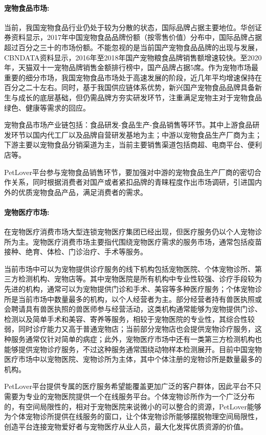 \documentclass[a4paper]{ctexart}
\begin{document}
\paragraph{宠物食品市场:}

当前，我国宠物食品行业仍处于较为分散的状态，国际品牌占据主要地位。华创证券资料显示，2017年中国宠物食品品牌份额（按零售价值）分布中，国际品牌占据超过百分之三十的市场份额。不能忽视的是当前国产宠物食品品牌的出现与发展，CBNDATA资料显示，2016年至2018年国产宠物粮食品牌销售额增速较快。至2020年，天猫双十一宠物品牌销售金额排行榜中，国产品牌占据5席。作为宠物市场最重要的细分市场，我国宠物食品市场处于高速发展的阶段，近几年平均增速保持在百分之二十左右。同时，基于我国供应链体系优势，新兴国产宠物食品品牌具备新生与成长的底层基础，但仍需品牌方夯实研发环节，注重满足宠物主对于宠物食品绿色、健康等需求的回应。

宠物食品市场产业链包括：食品研发-食品生产-食品销售等环节。其中上游食品研发环节以国内代工厂以及品牌自营研发基地为主；中游以宠物食品生产厂商为主；下游主要以宠物食品分销渠道为主，当前主要销售渠道包括商超、电商平台、便利店等。

PetLover平台参与宠物食品销售环节，要加强对中游的宠物食品生产厂商的密切合作关系，同时根据消费者对国产或者紧扣品牌的青睐程度作出市场调研，引进国内外的优质宠物食品产品，满足消费者的需求。

\paragraph{宠物医疗市场:}

在宠物医疗消费市场大型连锁宠物医疗集团已经出现，但医疗服务仍以个人宠物诊所为主。宠物医疗消费市场主要指代围绕宠物医疗需求的服务市场，通常包括疫苗接种、绝育、体检、门诊治疗、手术等服务。

当前市场中可以为宠物提供诊疗服务的线下机构包括宠物医院、个体宠物诊所、第三方检测机构、宠物店等。其中宠物医院是所有机构中专业性较强、诊疗手段较为先进的机构，通常可以为宠物提供门诊和手术、美容等多种医疗服务；个体宠物诊所是当前市场中数量最多的机构，以个人经营者为主。部分经营者持有兽医执照或会聘请具有兽医执照的兽医师参与经营活动，这类机构通常能够为宠物提供门诊、检测以及简单手术和美容、寄养等服务，相较于宠物医院的专业性，其综合性较弱，同时诊疗能力又高于普通宠物店；当前部分宠物店也会提供宠物诊疗服务，这种服务通常仅针对简单的病症；此外，宠物医疗市场中还有一类第三方检测机构也能够提供宠物诊疗服务，不过这种服务通常围绕动物样本检测展开。目前中国宠物医疗市场中以宠物医院、宠物诊所为主体，其中个体注册的宠物诊所是数量最多的机构。

PetLover平台提供专属的医疗服务希望能覆盖更加广泛的客户群体，因此平台不只需要为专业的宠物医院提供一个在线服务平台。个体宠物诊所作为一个广泛分布的，有空间局限性的，相对于宠物医院来说微小的可以整合的资源，PetLover能够为个体宠物诊所提供在线服务的窗口，让个体宠物诊所能够摆脱物理空间局限性，创造平台连接宠物爱好者与宠物医疗从业人员，最大化发挥优质资源的价值。
\end{document}
